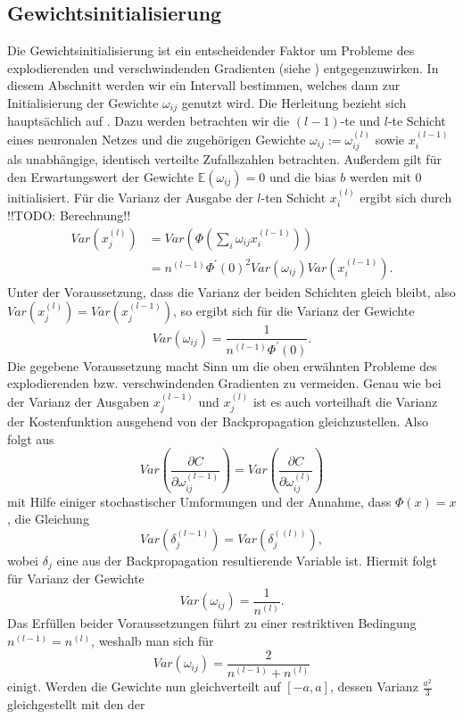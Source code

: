 \subsection{Gewichtsinitialisierung}
\label{subsec:gewichtsinitialisierung}
Die Gewichtsinitialisierung ist ein entscheidender Faktor um Probleme des explodierenden und verschwindenden Gradienten
(siehe \cite{wangVanishingGradientProblem2019}) entgegenzuwirken.
In diesem Abschnitt werden wir ein Intervall bestimmen, welches dann zur Initialisierung der Gewichte $\omega_{ij}$
genutzt wird. Die Herleitung bezieht sich hauptsächlich auf \cite[191-195]{ovidiucalinDeepLearningArchitectures}.
Dazu werden betrachten wir die $(l-1)$-te und $l$-te Schicht eines neuronalen Netzes und die
zugehörigen Gewichte $\omega_{ij}:=\omega_{ij}^{(l)}$ sowie $x_{i}^{(l-1)}$ als unabhängige, identisch verteilte
Zufallszahlen betrachten. Außerdem gilt für den Erwartungswert der Gewichte $\mathbb{E}(\omega_{ij})=0$ und die bias $b$
werden mit $0$ initialisiert. Für die Varianz der Ausgabe der $l$-ten Schicht $x_i^{(l)}$ ergibt sich durch
!!TODO: Berechnung!!
\begin{align*}
    Var(x_j^{(l)}) &= Var\left( \Phi\left( \sum_{i} \omega_{ij}x_i^{(l-1)} \right) \right)\\
    &= n^{(l-1)} \Phi^{\prime}(0)^2 Var(\omega_{ij}) Var(x_i^{(l-1)}).
\end{align*}
Unter der Voraussetzung, dass die Varianz der beiden Schichten gleich bleibt, also $Var(x_j^{(l)})=Var(x_j^{(l-1)})$,
so ergibt sich für die Varianz der Gewichte
\[
    Var(\omega_{ij}) = \frac{1}{n^{(l-1)}\Phi^{\prime}(0)}.
\]
Die gegebene Voraussetzung macht Sinn um die oben erwähnten Probleme des explodierenden bzw. verschwindenden Gradienten
zu vermeiden. Genau wie bei der Varianz der Ausgaben $x_j^{(l-1)}$ und $x_j^{(l)}$ ist es auch vorteilhaft die Varianz
der Kostenfunktion ausgehend von der Backpropagation gleichzustellen. Also folgt aus
\[
    Var(\frac{\partial C}{\partial \omega_{ij}^{(l-1)}}) = Var(\frac{\partial C}{\partial \omega_{ij}^{(l)}})
\]
mit Hilfe einiger stochastischer Umformungen und der Annahme, dass $\Phi(x)=x$, die Gleichung
\[
    Var(\delta_j^{(l-1)}) = Var(\delta_j^{((l))}),
\]
wobei $\delta_j$ eine aus der Backpropagation resultierende Variable ist. Hiermit folgt für Varianz der Gewichte
\[
    Var(\omega_{ij}) = \frac{1}{n^{(l)}}.
\]
Das Erfüllen beider Voraussetzungen führt zu einer restriktiven Bedingung $n^{(l-1)} = n^{(l)}$, weshalb man sich für
\[
    Var(\omega_{ij})= \frac{2}{n^{(l-1)} + n^{(l)}}
\]
einigt. Werden die Gewichte nun gleichverteilt auf $[-a,a]$, dessen Varianz $\frac{a^2}{3}$ gleichgestellt mit den der
